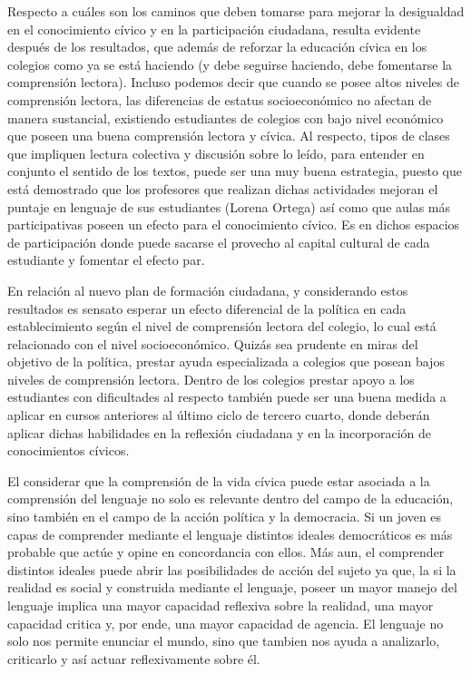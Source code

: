 \documentclass[12pt,twoside]{templates/facsothesis}
\begin{document}
Respecto a cuáles son los caminos que deben tomarse para mejorar la desigualdad en el conocimiento cívico y en la participación ciudadana, resulta evidente después de los resultados, que además de reforzar la educación cívica en los colegios como ya se está haciendo (y debe seguirse haciendo, debe fomentarse la comprensión lectora). Incluso podemos decir que cuando se posee altos niveles de comprensión lectora, las diferencias de estatus socioeconómico no afectan de manera sustancial, existiendo estudiantes de colegios con bajo nivel económico que poseen una buena comprensión lectora y cívica. Al respecto, tipos de clases que impliquen lectura colectiva y discusión sobre lo leído, para entender en conjunto el sentido de los textos, puede ser una muy buena estrategia, puesto que está demostrado que los profesores que realizan dichas actividades mejoran el puntaje en lenguaje de sus estudiantes (Lorena Ortega) así como que aulas más participativas poseen un efecto para el conocimiento cívico. Es en dichos espacios de participación donde puede sacarse el provecho al capital cultural de cada estudiante y fomentar el efecto par.

En relación al nuevo plan de formación ciudadana, y considerando estos resultados es sensato esperar un efecto diferencial de la política en cada establecimiento según el nivel de comprensión lectora del colegio, lo cual está relacionado con el nivel socioeconómico. Quizás sea prudente en miras del objetivo de la política, prestar ayuda especializada a colegios que posean bajos niveles de comprensión lectora. Dentro de los colegios prestar apoyo a los estudiantes con dificultades al respecto también puede ser una buena medida a aplicar en cursos anteriores al último ciclo de tercero cuarto, donde deberán aplicar dichas habilidades en la reflexión ciudadana y en la incorporación de conocimientos cívicos.

El considerar que la comprensión de la vida cívica puede estar asociada a la comprensión del lenguaje no solo es relevante dentro del campo de la educación, sino también en el campo de la acción política y la democracia. Si un joven es capas de comprender mediante el lenguaje distintos ideales democráticos es más probable que actúe y opine en concordancia con ellos. Más aun, el comprender distintos ideales puede abrir las posibilidades de acción del sujeto ya que, la si la realidad es social y construida mediante el lenguaje, poseer un mayor manejo del lenguaje implica una mayor capacidad reflexiva sobre la realidad, una mayor capacidad critica y, por ende, una mayor capacidad de agencia. El lenguaje no solo nos permite enunciar el mundo, sino que tambien nos ayuda a analizarlo, criticarlo y así actuar reflexivamente sobre él.
\end{document}

